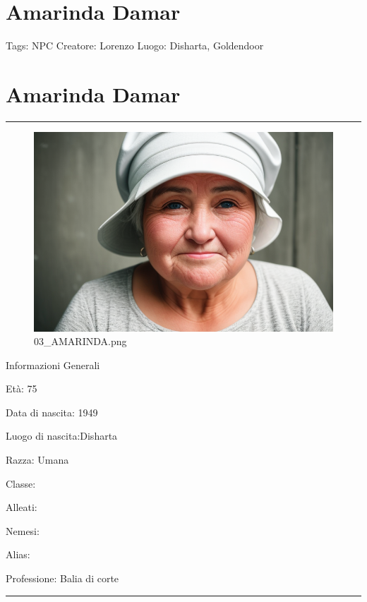 \section{Amarinda Damar}\label{amarinda-damar}

Tags: NPC Creatore: Lorenzo Luogo: Disharta, Goldendoor

\section{\texorpdfstring{\textbf{Amarinda
Damar}}{Amarinda Damar}}\label{amarinda-damar-1}

\begin{center}\rule{0.5\linewidth}{0.5pt}\end{center}

\begin{figure}
\centering
\includegraphics{03_AMARINDA.png}
\caption{03\_AMARINDA.png}
\end{figure}

Informazioni Generali

Età: 75

Data di nascita: 1949

Luogo di nascita:Disharta

Razza: Umana

Classe:

Alleati:

Nemesi:

Alias:

Professione: Balia di corte

\begin{center}\rule{0.5\linewidth}{0.5pt}\end{center}

